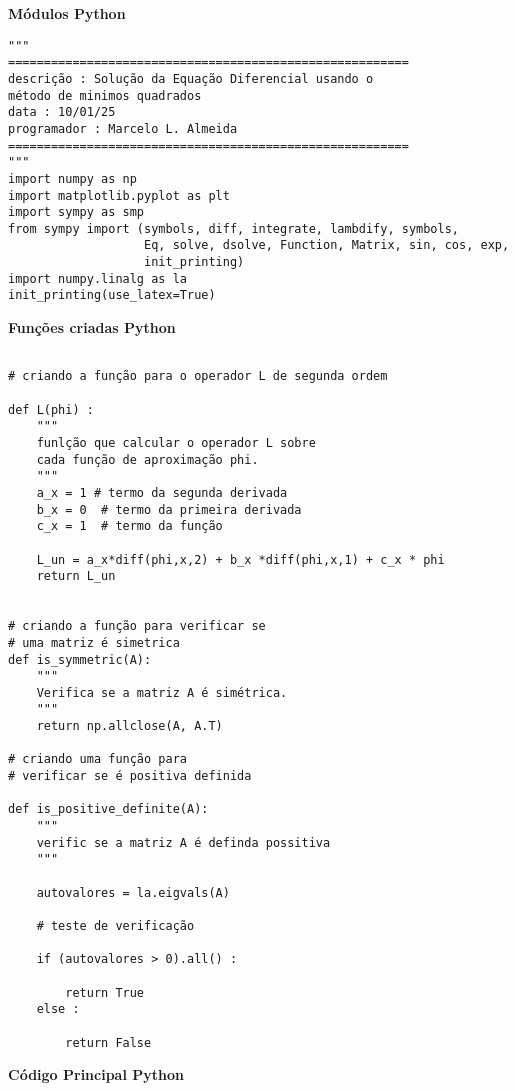 \documentclass[a4paper, 12pt]{article}
\numberwithin{equation}{section}
\begin{document}
\vspace{0.5cm}


{\textbf{\large Módulos Python}}



\begin{lstlisting}
"""
========================================================
descrição : Solução da Equação Diferencial usando o 
método de minimos quadrados
data : 10/01/25
programador : Marcelo L. Almeida 
========================================================
"""
import numpy as np 
import matplotlib.pyplot as plt
import sympy as smp 
from sympy import (symbols, diff, integrate, lambdify, symbols, 
                   Eq, solve, dsolve, Function, Matrix, sin, cos, exp,
                   init_printing)
import numpy.linalg as la  
init_printing(use_latex=True)
\end{lstlisting}

{\textbf{\large Funções criadas Python}}

\begin{lstlisting}

# criando a função para o operador L de segunda ordem 

def L(phi) : 
    """
    funlção que calcular o operador L sobre 
    cada função de aproximação phi. 
    """ 
    a_x = 1 # termo da segunda derivada 
    b_x = 0  # termo da primeira derivada
    c_x = 1  # termo da função 
    
    L_un = a_x*diff(phi,x,2) + b_x *diff(phi,x,1) + c_x * phi
    return L_un 


# criando a função para verificar se 
# uma matriz é simetrica
def is_symmetric(A):
    """
    Verifica se a matriz A é simétrica.
    """
    return np.allclose(A, A.T)

# criando uma função para 
# verificar se é positiva definida 

def is_positive_definite(A): 
    """
    verific se a matriz A é definda possitiva 
    """
    
    autovalores = la.eigvals(A)
    
    # teste de verificação 
    
    if (autovalores > 0).all() : 
        
        return True 
    else : 
        
        return False 
\end{lstlisting}


{\textbf{\large Código Principal Python}}
\end{document}
